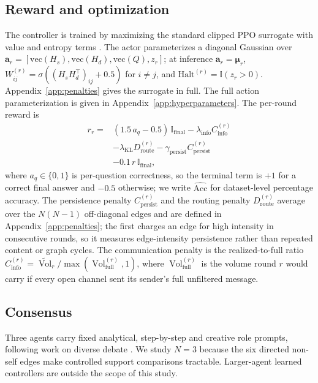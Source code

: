 \documentclass[11pt]{article}
\newcommand{\Vol}{\operatorname{Vol}}
\newcommand{\Volt}{\widetilde{\Vol}}
\begin{document}
\subsection{Reward and optimization}
\label{sec:reward}

The controller is trained by maximizing the standard clipped PPO surrogate with
value and entropy terms \citep{schulman2017ppo}. The actor parameterizes a
diagonal Gaussian over
$\mathbf{a}_r=[\mathrm{vec}(H_s),\mathrm{vec}(H_d),\mathrm{vec}(Q),z_r]$; at
inference $\mathbf a_r=\boldsymbol\mu_r$,
$W_{ij}^{(r)}=\sigma((H_sH_d^\top)_{ij}+0.5)$ for $i\ne j$, and
$\mathrm{Halt}^{(r)}=\mathbb{I}(z_r>0)$. Appendix~\ref{app:penalties} gives the
surrogate in full. The full action parameterization is given in
Appendix~\ref{app:hyperparameters}. The per-round reward is
\begin{equation}
\begin{aligned}
r_r ={}& (1.5\,a_q-0.5)\,\mathbb{I}_{\mathrm{final}}
 -\lambda_{\mathrm{info}}C^{(r)}_{\mathrm{info}}\\
 &-\lambda_{\mathrm{KL}}D^{(r)}_{\mathrm{route}}
  -\gamma_{\mathrm{persist}}C^{(r)}_{\mathrm{persist}}\\
 &-0.1\,r\,\mathbb{I}_{\mathrm{final}} ,
\end{aligned}
\label{eq:reward}
\end{equation}
where $a_q\in\{0,1\}$ is per-question correctness, so the terminal term is $+1$
for a correct final answer and $-0.5$ otherwise; we write $\widehat{\mathrm{Acc}}$
for dataset-level percentage accuracy. The persistence penalty
$C^{(r)}_{\mathrm{persist}}$ and the routing penalty $D^{(r)}_{\mathrm{route}}$
average over the $N(N{-}1)$ off-diagonal edges and are defined in
Appendix~\ref{app:penalties}; the first charges an edge for high intensity in
consecutive rounds, so it measures edge-intensity persistence rather than
repeated content or graph cycles. The communication penalty is the
realized-to-full ratio
$C^{(r)}_{\mathrm{info}}=\Volt_r/\max(\Vol_{\mathrm{full}}^{(r)},1)$, where
$\Vol_{\mathrm{full}}^{(r)}$ is the volume round $r$ would carry if every
open channel sent its sender's full unfiltered message. \subsection{Consensus}
\label{sec:consensus}

Three agents carry fixed analytical, step-by-step and creative role prompts,
following work on diverse debate
\citep{du2024improving,liang-etal-2024-encouraging,liu2025breaking}. We study
$N=3$ because the six directed non-self edges make controlled support
comparisons tractable. Larger-agent learned controllers are outside the scope
of this study.
\end{document}
